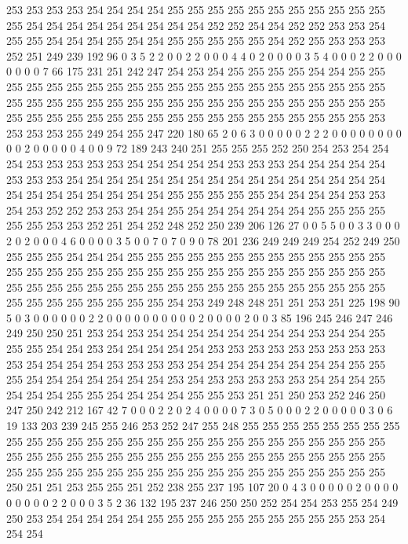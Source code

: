 253 253 253 253 254 254 254 254 255 255 255 255 255 255 255 255 255 255 255 255
254 254 254 254 254 254 254 254 254 252 252 254 254 252 252 253 253 254 255 255
254 254 254 255 254 254 255 255 255 255 255 254 252 255 253 253 253 252 251 249
239 192 96 0 3 5 2 2 0 0 2 2 0 0 0 4 4 0 2 0
0 0 0 3 5 4 0 0 0 2 2 0 0 0 0 0 0 0 7 66
175 231 251 242 247 254 253 254 255 255 255 255 254 254 255 255 255 255 255 255
255 255 255 255 255 255 255 255 255 255 255 255 255 255 255 255 255 255 255 255
255 255 255 255 255 255 255 255 255 255 255 255 255 255 255 255 255 255 255 255
255 255 255 255 255 255 255 255 255 255 255 255 253 253 253 253 255 249 254 255
247 220 180 65 2 0 6 3 0 0 0 0 0 2 2 2 0 0 0 0
0 0 0 0 0 0 2 0 0 0 0 0 4 0 0 9 72 189 243 240
251 255 255 255 252 250 254 253 254 254 254 253 253 253 253 253 254 254 254 254
254 253 253 253 254 254 254 254 254 253 253 253 254 254 254 254 254 254 254 254
254 254 254 254 254 254 254 254 254 254 254 254 254 254 254 254 255 255 255 255
255 254 254 254 254 253 253 254 253 252 252 253 253 254 254 255 254 254 254 254
254 254 255 255 255 255 255 255 253 253 252 251 254 252 248 252 250 239 206 126
27 0 0 5 5 0 0 3 3 0 0 0 2 0 2 0 0 0 4 6
0 0 0 0 3 5 0 0 7 0 7 0 9 0 78 201 236 249 249 249
254 252 249 250 255 255 255 254 254 254 255 255 255 255 255 255 255 255 255 255
255 255 255 255 255 255 255 255 255 255 255 255 255 255 255 255 255 255 255 255
255 255 255 255 255 255 255 255 255 255 255 255 255 255 255 255 255 255 255 255
255 255 255 255 255 255 255 255 255 254 253 249 248 248 251 251 253 251 225 198
90 5 0 3 0 0 0 0 0 0 2 2 0 0 0 0 0 0 0 0
0 0 2 0 0 0 0 2 0 0 3 85 196 245 246 247 246 249 250 250
251 253 254 253 254 254 254 254 254 254 254 254 253 254 254 255 255 255 254 254
253 254 254 254 254 254 253 253 253 253 253 253 253 253 253 253 254 254 254 254
253 253 253 253 254 254 254 254 254 254 254 254 255 255 255 254 254 254 254 254
254 254 253 254 253 253 253 253 253 254 254 254 255 254 254 254 255 255 254 254
254 254 255 255 253 251 251 250 253 252 246 250 247 250 242 212 167 42 7 0
0 0 2 2 0 2 4 0 0 0 0 7 3 0 5 0 0 0 2 2
0 0 0 0 0 3 0 6 19 133 203 239 245 255 246 253 252 247 255 248
255 255 255 255 255 255 255 255 255 255 255 255 255 255 255 255 255 255 255 255
255 255 255 255 255 255 255 255 255 255 255 255 255 255 255 255 255 255 255 255
255 255 255 255 255 255 255 255 255 255 255 255 255 255 255 255 255 255 255 255
255 255 255 255 255 250 251 251 253 255 255 251 252 238 255 237 195 107 20 0
4 3 0 0 0 0 0 2 0 0 0 0 0 0 0 0 0 2 2 0
0 0 3 5 2 36 132 195 237 246 250 250 252 254 254 253 255 254 249 250
253 254 254 254 254 254 255 255 255 255 255 255 255 255 255 255 253 254 254 254
